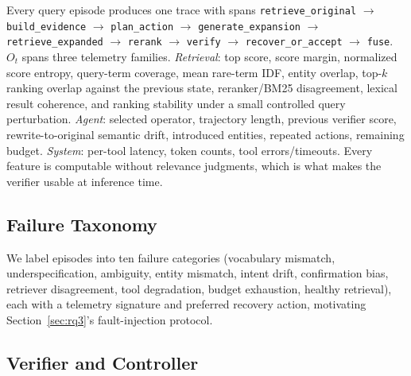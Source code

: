 \documentclass[conference]{IEEEtran}
\begin{document}
Every query episode produces one trace with spans
\texttt{retrieve\_original} $\to$ \texttt{build\_evidence} $\to$
\texttt{plan\_action} $\to$ \texttt{generate\_expansion} $\to$
\texttt{retrieve\_expanded} $\to$ \texttt{rerank} $\to$ \texttt{verify}
$\to$ \texttt{recover\_or\_accept} $\to$ \texttt{fuse}. $O_t$ spans
three telemetry families. \emph{Retrieval}: top score, score margin,
normalized score entropy, query-term coverage, mean rare-term IDF,
entity overlap, top-$k$ ranking overlap against the previous state,
reranker/BM25 disagreement, lexical result coherence, and ranking
stability under a small controlled query perturbation. \emph{Agent}:
selected operator, trajectory length, previous verifier score,
rewrite-to-original semantic drift, introduced entities, repeated
actions, remaining budget. \emph{System}: per-tool latency, token
counts, tool errors/timeouts. Every feature is computable without
relevance judgments, which is what makes the verifier usable at
inference time.

\subsection{Failure Taxonomy}

We label episodes into ten failure categories (vocabulary mismatch,
underspecification, ambiguity, entity mismatch, intent drift,
confirmation bias, retriever disagreement, tool degradation, budget
exhaustion, healthy retrieval), each with a telemetry signature and
preferred recovery action, motivating Section~\ref{sec:rq3}'s
fault-injection protocol.

\subsection{Verifier and Controller}
\label{sec:controller}
\end{document}
